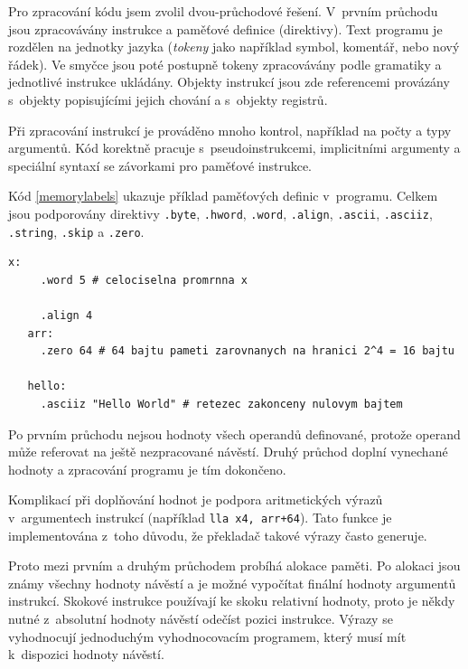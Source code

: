 Pro zpracování kódu jsem zvolil dvou-průchodové řešení.
V~prvním průchodu jsou zpracovávány instrukce a paměťové definice (direktivy).
Text programu je rozdělen na jednotky jazyka (\emph{tokeny} jako například symbol, komentář, nebo nový řádek).
Ve smyčce jsou poté postupně tokeny zpracovávány podle gramatiky a jednotlivé instrukce ukládány.
Objekty instrukcí jsou zde referencemi provázány s~objekty popisujícími jejich chování a s~objekty registrů.

Při zpracování instrukcí je prováděno mnoho kontrol, například na počty a typy argumentů.
Kód korektně pracuje s~pseudoinstrukcemi, implicitními argumenty a speciální syntaxí se závorkami pro paměťové instrukce.

Kód \ref{memorylabels} ukazuje příklad paměťových definic v~programu.
Celkem jsou podporovány direktivy \texttt{.byte}, \texttt{.hword}, \texttt{.word}, \texttt{.align}, \texttt{.ascii}, \texttt{.asciiz}, \texttt{.string}, \texttt{.skip} a \texttt{.zero}.

\begin{lstlisting}[caption={Příklady dat definovaných v~assembleru. Na takto definovanou paměť se v~programu odkazuje návěstími (například \texttt{arr}).},captionpos=b,label=memorylabels]
   x:
     .word 5 # celociselna promrnna x

     .align 4
   arr:
     .zero 64 # 64 bajtu pameti zarovnanych na hranici 2^4 = 16 bajtu

   hello:
     .asciiz "Hello World" # retezec zakonceny nulovym bajtem
\end{lstlisting}

Po prvním průchodu nejsou hodnoty všech operandů definované, protože operand může referovat na ještě nezpracované návěstí.
Druhý průchod doplní vynechané hodnoty a zpracování programu je tím dokončeno.

Komplikací při doplňování hodnot je podpora aritmetických výrazů v~argumentech instrukcí (například \texttt{lla x4, arr+64}).
Tato funkce je implementována z~toho důvodu, že překladač takové výrazy často generuje.

Proto mezi prvním a druhým průchodem probíhá alokace paměti.
Po alokaci jsou známy všechny hodnoty návěstí a je možné vypočítat finální hodnoty argumentů instrukcí.
Skokové instrukce používají ke skoku relativní hodnoty, proto je někdy nutné z~absolutní hodnoty návěstí odečíst pozici instrukce.
Výrazy se vyhodnocují jednoduchým vyhodnocovacím programem, který musí mít k~dispozici hodnoty návěstí.

